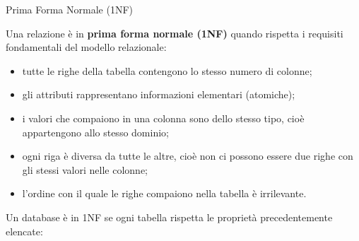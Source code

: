 %
\begin{frame}{Prima Forma Normale (1NF)}
\begin{minipage}{0.9\textwidth}
Una relazione \`e in \textbf{prima forma normale (1NF)} quando rispetta i requisiti fondamentali del modello relazionale:
\vspace{.1cm}

    \begin{minipage}{0.8\textwidth}
        \begin{itemize}[<+->]
            \item tutte le righe della tabella contengono lo stesso numero di colonne;
            \item gli attributi rappresentano informazioni elementari (atomiche);
            \item i valori che compaiono in una colonna sono dello stesso tipo, cio\`e appartengono allo stesso dominio;
            \item ogni riga \`e diversa da tutte le altre, cio\`e non ci possono essere due righe con gli stessi valori nelle colonne;
            \item l'ordine con il quale le righe compaiono nella tabella \`e irrilevante.
        \end{itemize}
    \end{minipage}
\pause
\begin{minipage}{0.8\textwidth}
\vspace{.2cm}
Un database \`e in 1NF se ogni tabella rispetta le propriet\`a precedentemente elencate:
\end{minipage}
\end{minipage}
\end{frame}
%
